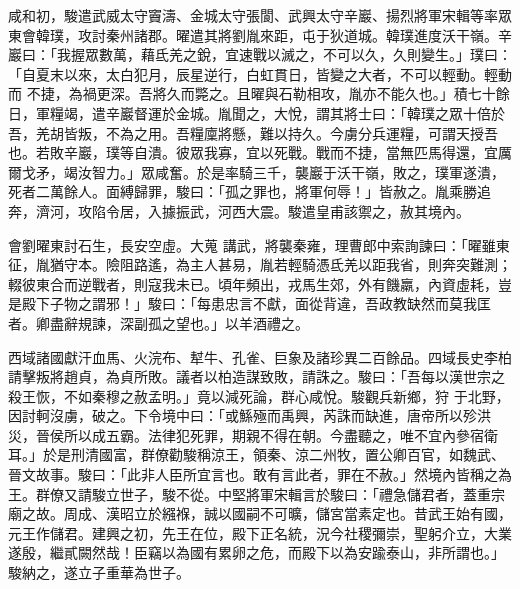 \begin{pinyinscope}
 咸和初，駿遣武威太守竇濤、金城太守張閬、武興太守辛巖、揚烈將軍宋輯等率眾東會韓璞，攻討秦州諸郡。曜遣其將劉胤來距，屯于狄道城。韓璞進度沃干嶺。辛巖曰：「我握眾數萬，藉氐羌之銳，宜速戰以滅之，不可以久，久則變生。」璞曰：「自夏末以來，太白犯月，辰星逆行，白虹貫日，皆變之大者，不可以輕動。輕動而
 不捷，為禍更深。吾將久而斃之。且曜與石勒相攻，胤亦不能久也。」積七十餘日，軍糧竭，遣辛巖督運於金城。胤聞之，大悅，謂其將士曰：「韓璞之眾十倍於吾，羌胡皆叛，不為之用。吾糧廩將懸，難以持久。今虜分兵運糧，可謂天授吾也。若敗辛巖，璞等自潰。彼眾我寡，宜以死戰。戰而不捷，當無匹馬得還，宜厲爾戈矛，竭汝智力。」眾咸奮。於是率騎三千，襲巖于沃干嶺，敗之，璞軍遂潰，死者二萬餘人。面縛歸罪，駿曰：「孤之罪也，將軍何辱！」皆赦之。胤乘勝追奔，濟河，攻陷令居，入據振武，河西大震。駿遣皇甫該禦之，赦其境內。



 會劉曜東討石生，長安空虛。大蒐
 講武，將襲秦雍，理曹郎中索詢諫曰：「曜雖東征，胤猶守本。險阻路遙，為主人甚易，胤若輕騎憑氐羌以距我省，則奔突難測；輟彼東合而逆戰者，則寇我未已。頃年頻出，戎馬生郊，外有饑羸，內資虛耗，豈是殿下子物之謂邪！」駿曰：「每患忠言不獻，面從背違，吾政教缺然而莫我匡者。卿盡辭規諫，深副孤之望也。」以羊酒禮之。



 西域諸國獻汗血馬、火浣布、犎牛、孔雀、巨象及諸珍異二百餘品。四域長史李柏請擊叛將趙貞，為貞所敗。議者以柏造謀致敗，請誅之。駿曰：「吾每以漢世宗之殺王恢，不如秦穆之赦孟明。」竟以減死論，群心咸悅。駿觀兵新鄉，狩
 于北野，因討軻沒虜，破之。下令境中曰：「或鯀殛而禹興，芮誅而缺進，唐帝所以殄洪災，晉侯所以成五霸。法律犯死罪，期親不得在朝。今盡聽之，唯不宜內參宿衛耳。」於是刑清國富，群僚勸駿稱涼王，領秦、涼二州牧，置公卿百官，如魏武、晉文故事。駿曰：「此非人臣所宜言也。敢有言此者，罪在不赦。」然境內皆稱之為王。群僚又請駿立世子，駿不從。中堅將軍宋輯言於駿曰：「禮急儲君者，蓋重宗廟之故。周成、漢昭立於繦褓，誠以國嗣不可曠，儲宮當素定也。昔武王始有國，元王作儲君。建興之初，先王在位，殿下正名統，況今社稷彌崇，聖躬介立，大業
 遂殷，繼貳闕然哉！臣竊以為國有累卵之危，而殿下以為安踰泰山，非所謂也。」駿納之，遂立子重華為世子。




\end{pinyinscope}
